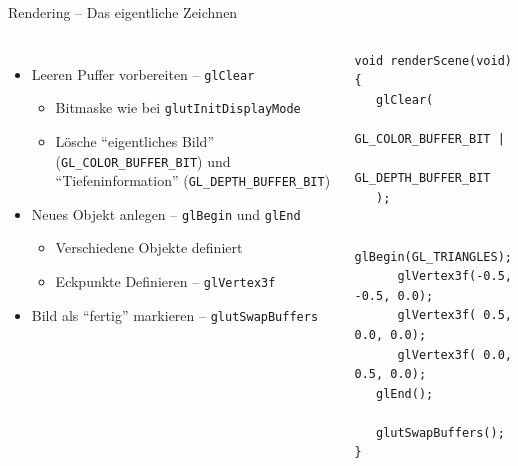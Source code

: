 \begin{frame}[fragile]{Rendering -- Das eigentliche Zeichnen}
%
\begin{columns}[T]
\begin{itemize}
\item Leeren Puffer vorbereiten -- \texttt{glClear}
	\begin{itemize}
	\item Bitmaske wie bei \texttt{glutInitDisplayMode}
	\item Lösche \enquote{eigentliches Bild} (\texttt{GL\_COLOR\_BUFFER\_BIT}) 
		und \enquote{Tiefeninformation} (\texttt{GL\_DEPTH\_BUFFER\_BIT})
	\end{itemize}
\item Neues Objekt anlegen -- \texttt{glBegin} und \texttt{glEnd}
	\begin{itemize}
	\item Verschiedene Objekte definiert
	\item Eckpunkte Definieren -- \texttt{glVertex3f}
	\end{itemize}
\item Bild als \enquote{fertig} markieren -- \texttt{glutSwapBuffers}
\end{itemize}
%
\begin{codebox}
\begin{verbatim}
void renderScene(void) {
   glClear(
      GL_COLOR_BUFFER_BIT | 
      GL_DEPTH_BUFFER_BIT
   );

   glBegin(GL_TRIANGLES);
      glVertex3f(-0.5, -0.5, 0.0);
      glVertex3f( 0.5,  0.0, 0.0);
      glVertex3f( 0.0,  0.5, 0.0);
   glEnd();

   glutSwapBuffers();
}
\end{verbatim}
\end{codebox}
\end{columns}
%
\end{frame}


